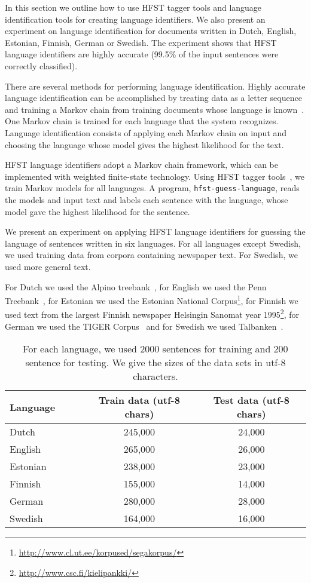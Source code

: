 \documentclass{llncs}
\begin{document}
In this section we outline how to use HFST tagger tools and language
identification tools for creating language identifiers. We also
present an experiment on language identification for documents written
in Dutch, English, Estonian, Finnish, German or Swedish. The
experiment shows that HFST language identifiers are highly accurate
(99.5\% of the input sentences were correctly classified).

There are several methods for performing language
identification. Highly accurate language identification can be
accomplished by treating data as a letter sequence and training
a Markov chain from training documents whose language is
known~\cite{cavnar/1994}. One Markov chain is trained for each
language that the system recognizes. Language identification consists
of applying each Markov chain on input and choosing the language whose
model gives the highest likelihood for the text. 

HFST language identifiers adopt a Markov chain framework, which can be
implemented with weighted finite-state technology. Using HFST tagger
tools~\cite{silfverberg/2011}, we train Markov models for all
languages. A program, {\tt hfst-guess-language}, reads the
models and input text and labels each sentence with the language,
whose model gave the highest likelihood for the sentence.

We present an experiment on applying HFST language identifiers for
guessing the language of sentences written in six languages. For all
languages except Swedish, we used training data from corpora
containing newspaper text. For Swedish, we used more general text.

For Dutch we used the Alpino treebank~\cite{bouma/2000}, for English
we used the Penn Treebank~\cite{marcus/1993}, for Estonian we used the
Estonian National
Corpus\footnote{\url{http://www.cl.ut.ee/korpused/segakorpus/}}, for
Finnish we used text from the largest Finnish newspaper Helsingin
Sanomat year 1995\footnote{\url{http://www.csc.fi/kielipankki/}}, for
German we used the TIGER Corpus~\cite{brants/2002} and for Swedish we
used Talbanken~\cite{einarsson/1976}.

\begin{table}
\small
\begin{center}
\caption{For each language, we used 2000 sentences for training and
  200 sentence for testing. We give the sizes of the data sets in
  utf-8 characters.}\label{tab:lang-id-data}
\begin{tabular}{l|cc}
Language~~~~ & Train data (utf-8 chars) & Test data (utf-8 chars)\\
\hline
Dutch    & 245,000  & 24,000\\
English  & 265,000  & 26,000\\
Estonian & 238,000  & 23,000\\
Finnish  & 155,000  & 14,000\\
German   & 280,000  & 28,000\\
Swedish  & 164,000  & 16,000\\
\hline
\end{tabular}
\end{center}
\end{table}
\end{document}
